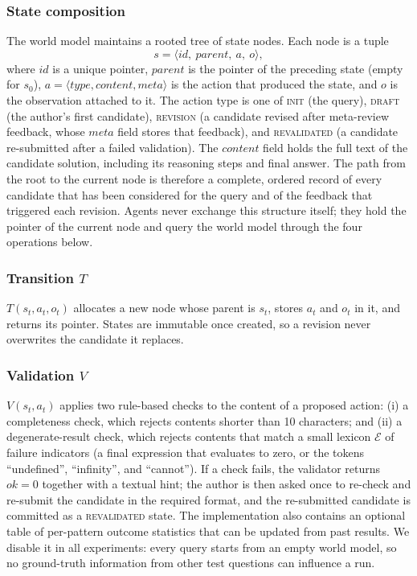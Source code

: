 \subsubsection{State composition}
The world model maintains a rooted tree of state nodes. Each node is a tuple
\begin{equation}
s = \langle \mathit{id},\ \mathit{parent},\ a,\ o \rangle ,
\end{equation}
where \(\mathit{id}\) is a unique pointer, \(\mathit{parent}\) is the pointer of the preceding state (empty for \(s_0\)), \(a = \langle \mathit{type}, \mathit{content}, \mathit{meta} \rangle\) is the action that produced the state, and \(o\) is the observation attached to it.
The action type is one of \textsc{init} (the query), \textsc{draft} (the author's first candidate), \textsc{revision} (a candidate revised after meta-review feedback, whose \(\mathit{meta}\) field stores that feedback), and \textsc{revalidated} (a candidate re-submitted after a failed validation).
The \(\mathit{content}\) field holds the full text of the candidate solution, including its reasoning steps and final answer.
The path from the root to the current node is therefore a complete, ordered record of every candidate that has been considered for the query and of the feedback that triggered each revision.
Agents never exchange this structure itself; they hold the pointer of the current node and query the world model through the four operations below.

\subsubsection{Transition \(T\)}
\(T(s_t, a_t, o_t)\) allocates a new node whose parent is \(s_t\), stores \(a_t\) and \(o_t\) in it, and returns its pointer. States are immutable once created, so a revision never overwrites the candidate it replaces.

\subsubsection{Validation \(V\)}
\(V(s_t, a_t)\) applies two rule-based checks to the content of a proposed action:
(i) a completeness check, which rejects contents shorter than 10 characters; and
(ii) a degenerate-result check, which rejects contents that match a small lexicon \(\mathcal{E}\) of failure indicators (a final expression that evaluates to zero, or the tokens ``undefined'', ``infinity'', and ``cannot'').
If a check fails, the validator returns \(\mathit{ok}=0\) together with a textual hint; the author is then asked once to re-check and re-submit the candidate in the required format, and the re-submitted candidate is committed as a \textsc{revalidated} state.
The implementation also contains an optional table of per-pattern outcome statistics that can be updated from past results. We disable it in all experiments: every query starts from an empty world model, so no ground-truth information from other test questions can influence a run.

